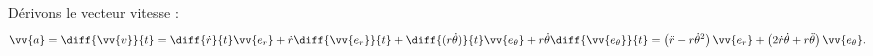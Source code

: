
\begin{corrige}
Dérivons le vecteur vitesse : 
\[
\vv{a}=\diff{\vv{v}}{t}=\diff{\dot{r}}{t} \vv{e_r} +\dot{r} \diff{\vv{e_r}}{t} + \diff{(r\dot{\theta})}{t} \vv{e_\theta}+r\dot{\theta} \diff{\vv{e_\theta}}{t}=\left( \ddot{r} - r \dot{\theta}^2\right) \vv{e_r} + \left( 2\dot{r}\dot{\theta} + r \ddot{\theta} \right) \vv{e_\theta}.
\]
\end{corrige}

\finEntrainement



\newpage









\hauteurLargeurCadreReponse		{6mm}{3cm}
\initialisationEntrainement




